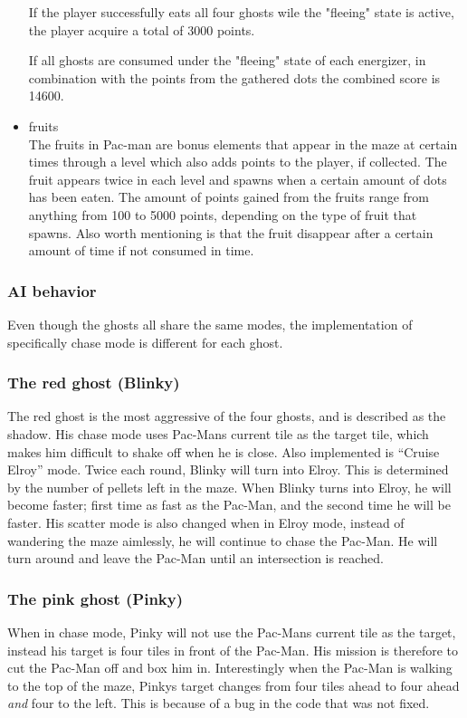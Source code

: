 \begin{itemize}
If the player successfully eats all four ghosts wile the "fleeing" state is active, the player acquire a total of 3000 points.

If all ghosts are consumed under the "fleeing" state of each energizer, in combination with the points from the gathered dots the combined score is 14600.
\item fruits\\
The fruits in Pac-man are bonus elements that appear in the maze at certain times through a level which also adds points to the player, if collected. The fruit appears twice in each level and spawns when a certain amount of dots has been eaten.
The amount of points gained from the fruits range from anything from 100 to 5000 points, depending on the type of fruit that spawns. Also worth mentioning is that the fruit disappear after a certain amount of time if not consumed in time.
\end{itemize}



\subsubsection{AI behavior}\label{ssec:ai_behavior}
Even though the ghosts all share the same modes, the implementation of specifically chase mode is different for each ghost.

\subsubsection*{The red ghost (Blinky)}
The red ghost is the most aggressive of the four ghosts, and is described as the shadow. His chase mode uses Pac-Mans current tile as the target tile, which makes him difficult to shake off when he is close. Also implemented is “Cruise Elroy” mode. Twice each round, Blinky will turn into Elroy. This is determined by the number of pellets left in the maze. When Blinky turns into Elroy, he will become faster; first time as fast as the Pac-Man, and the second time he will be faster. His scatter mode is also changed when in Elroy mode, instead of wandering the maze aimlessly, he will continue to chase the Pac-Man. He will turn around and leave the Pac-Man until an intersection is reached.

\subsubsection*{The pink ghost (Pinky)}
When in chase mode, Pinky will not use the Pac-Mans current tile as the target, instead his target is four tiles in front of the Pac-Man. His mission is therefore to cut the Pac-Man off and box him in. Interestingly when the Pac-Man is walking to the top of the maze, Pinkys target changes from four tiles ahead to four ahead \textit{and} four to the left. This is because of a bug in the code that was not fixed.

